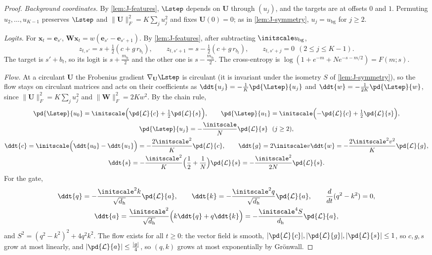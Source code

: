 \begin{proof}
\emph{Background coordinates.} By \cref{lem:J-features}, $\Lstep$ depends on $\mathbf U$ through $(u_j)$, and the targets are at offsets $0$ and $1$.
Permuting $u_2,\ldots,u_{K-1}$ preserves $\Lstep$ and $\|\mathbf U\|_F^2=K\sum_ju_j^2$ and fixes $\mathbf U(0)=0$; as in \cref{lem:J-symmetry},
$u_j=u_{\mathrm{bg}}$ for $j\ge2$.

\emph{Logits.} For $\bm x_t=\bm e_{s'}$, $\mathbf W\bm x_t=w(\bm e_{s'}-\bm e_{s'+1})$. By \cref{lem:J-features}, after subtracting $\initscale u_{\mathrm{bg}}$,
\[
 z_{t,s'}=s+\tfrac{1}{2}(c+g\,r_{b_t}),\qquad z_{t,s'+1}=s-\tfrac{1}{2}(c+g\,r_{b_t}),\qquad z_{t,s'+j}=0\ \ (2\le j\le K-1).
\]
The target is $s'+b_t$, so its logit is $s+\frac{m_{b_t}}{2}$ and the other one is $s-\frac{m_{b_t}}{2}$. The cross-entropy is
$\log(1+e^{-m}+Ne^{-s-m/2})=F(m;s)$.

\emph{Flow.} At a circulant $\mathbf U$ the Frobenius gradient $\nabla_{\mathbf U}\Lstep$ is circulant (it is invariant under the isometry $S$ of
\cref{lem:J-symmetry}), so the flow stays on circulant matrices and acts on their coefficients as $\ddt{u_j}=-\frac{1}{K}\pd{\Lstep}{u_j}$ and $\ddt{w}=-\frac{1}{2K}\pd{\Lstep}{w}$, since
$\|\mathbf U\|_F^2=K\sum_ju_j^2$ and $\|\mathbf W\|_F^2=2Kw^2$. By the chain rule,
\begin{gather*}
 \pd{\Lstep}{u_0}=\initscale\Bigl(\pd{\mathcal L}{c}+\tfrac{1}{2}\pd{\mathcal L}{s}\Bigr),\qquad \pd{\Lstep}{u_1}=\initscale\Bigl(-\pd{\mathcal L}{c}+\tfrac{1}{2}\pd{\mathcal L}{s}\Bigr),\\
 \pd{\Lstep}{u_j}=-\frac{\initscale}{N}\pd{\mathcal L}{s}\ \ (j\ge2),\\
 \ddt{c}=\initscale\Bigl(\ddt{u_0}-\ddt{u_1}\Bigr)=-\frac{2\initscale^2}{K}\pd{\mathcal L}{c},\qquad
 \ddt{g}=2\initscale v\ddt{w}=-\frac{2\initscale^2v^2}{K}\pd{\mathcal L}{g},\\
 \ddt{s}=-\frac{\initscale^2}{K}\Bigl(\frac{1}{2}+\frac{1}{N}\Bigr)\pd{\mathcal L}{s}=-\frac{\initscale^2}{2N}\pd{\mathcal L}{s}.
\end{gather*}
For the gate,
\begin{gather*}
 \ddt{q}=-\frac{\initscale^2k}{\sqrt{d_{\mathrm h}}}\pd{\mathcal L}{a},\qquad \ddt{k}=-\frac{\initscale^2q}{\sqrt{d_{\mathrm h}}}\pd{\mathcal L}{a},\qquad \frac{d}{dt}(q^2-k^2)=0,\\
 \ddt{a}=\frac{\initscale^2}{\sqrt{d_{\mathrm h}}}\Bigl(k\ddt{q}+q\ddt{k}\Bigr)=-\frac{\initscale^4S}{d_{\mathrm h}}\pd{\mathcal L}{a},
\end{gather*}
and $S^2=(q^2-k^2)^2+4q^2k^2$. The flow exists for all $t\ge0$: the vector field is smooth, $|\pd{\mathcal L}{c}|,|\pd{\mathcal L}{g}|,|\pd{\mathcal L}{s}|\le1$, so
$c,g,s$ grow at most linearly, and $|\pd{\mathcal L}{a}|\le\frac{|g|}{4}$, so $(q,k)$ grows at most exponentially by Gr\"onwall.
\end{proof}

